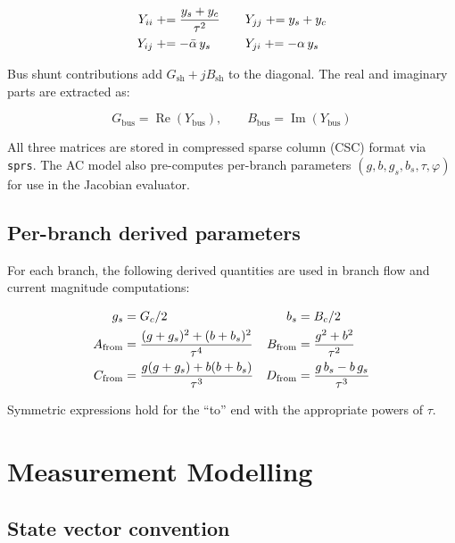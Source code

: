 \documentclass[11pt,a4paper]{article}
\begin{document}
\begin{align}
  Y_{ii}  &\mathrel{+}= \frac{y_s + y_c}{\tau^2}
  &\quad& Y_{jj} \mathrel{+}= y_s + y_c \notag \\
  Y_{ij}  &\mathrel{+}= -\bar{\alpha}\,y_s
  &\quad& Y_{ji} \mathrel{+}= -\alpha\,y_s
\end{align}

\noindent
Bus shunt contributions add $G_\text{sh} + jB_\text{sh}$ to the
diagonal.  The real and imaginary parts are extracted as:

\begin{equation}
  G_\text{bus} = \operatorname{Re}(Y_\text{bus}), \qquad
  B_\text{bus} = \operatorname{Im}(Y_\text{bus})
\end{equation}

\noindent
All three matrices are stored in compressed sparse column (CSC) format
via \texttt{sprs}.  The AC model also pre-computes per-branch parameters
$(g, b, g_s, b_s, \tau, \varphi)$ for use in the Jacobian evaluator.

\subsection{Per-branch derived parameters}\label{sec:branchparams}

For each branch, the following derived quantities are used in branch flow
and current magnitude computations:

\begin{align}
  g_s &= G_c / 2 & b_s &= B_c / 2 \notag \\
  A_\text{from} &= \frac{(g+g_s)^2 + (b+b_s)^2}{\tau^4}
  & B_\text{from} &= \frac{g^2 + b^2}{\tau^2} \notag \\
  C_\text{from} &= \frac{g(g+g_s) + b(b+b_s)}{\tau^3}
  & D_\text{from} &= \frac{g\,b_s - b\,g_s}{\tau^3}
\end{align}

\noindent
Symmetric expressions hold for the ``to'' end with the appropriate powers
of $\tau$.



\section{Measurement Modelling}\label{sec:meas}

\subsection{State vector convention}
\end{document}
